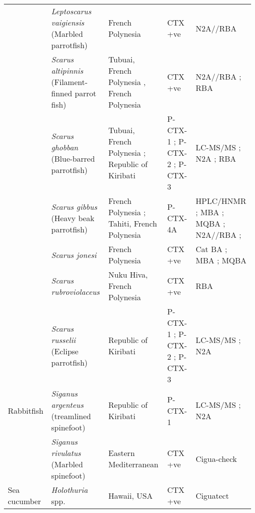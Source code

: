 \documentclass[12pt]{article}
\begin{document}
\begin{longtable}[l]{ | p{2cm} | p{3cm} | p{4.5cm} | p{2cm} | p{3cm} | }
	& \emph{Leptoscarus vaigiensis} (Marbled parrotfish) & French Polynesia \cite{chinain2014mail} & CTX +ve \cite{chinain2014mail} & N2A//RBA \cite{chinain2014mail} \\
	& \emph{Scarus altipinnis} (Filament-finned parrot fish) & Tubuai, French Polynesia \cite{darius2007ciguatera}, French Polynesia \cite{chinain2014mail} & CTX +ve \cite{darius2007ciguatera,chinain2014mail} & N2A//RBA \cite{chinain2014mail}; RBA \cite{darius2007ciguatera} \\
	& \emph{Scarus ghobban} (Blue-barred parrotfish) & Tubuai, French Polynesia \cite{darius2007ciguatera}; Republic of Kiribati \cite{mak2013pacific} & P-CTX-1 \cite{mak2013pacific}; P-CTX-2 \cite{mak2013pacific}; P-CTX-3 \cite{mak2013pacific} & LC-MS/MS \cite{mak2013pacific}; N2A \cite{mak2013pacific}; RBA \cite{darius2007ciguatera} \\
	& \emph{Scarus gibbus} (Heavy beak parrotfish) & French Polynesia \cite{bagnis1987use,satake1996isolation,chinain2014mail}; Tahiti, French Polynesia \cite{pompon1983ciguatera} & P-CTX-4A \cite{satake1996isolation} & HPLC/HNMR \cite{satake1996isolation}; MBA \cite{bagnis1987use,satake1996isolation,pompon1983ciguatera}; MQBA \cite{bagnis1987use}; N2A//RBA \cite{chinain2014mail}; \\
	& \emph{Scarus jonesi} & French Polynesia \cite{bagnis1987use} & CTX +ve \cite{bagnis1987use} & Cat BA \cite{bagnis1987use}; MBA \cite{bagnis1987use}; MQBA \cite{bagnis1987use} \\
	& \emph{Scarus rubroviolaceus} & Nuku Hiva, French Polynesia \cite{darius2007ciguatera} & CTX +ve \cite{darius2007ciguatera} & RBA \cite{darius2007ciguatera}\\
	& \emph{Scarus russelii} (Eclipse parrotfish) & Republic of Kiribati \cite{mak2013pacific} & P-CTX-1 \cite{mak2013pacific}; P-CTX-2 \cite{mak2013pacific}; P-CTX-3 \cite{mak2013pacific} & LC-MS/MS \cite{mak2013pacific}; N2A \cite{mak2013pacific} \\
    \hline
	Rabbitfish & \emph{Siganus argenteus} (treamlined spinefoot) & Republic of Kiribati \cite{mak2013pacific} & P-CTX-1 \cite{mak2013pacific} & LC-MS/MS \cite{mak2013pacific}; N2A \cite{mak2013pacific} \\
	 & \emph{Siganus rivulatus} (Marbled spinefoot) & Eastern Mediterranean \cite{bentur2007ciguatoxin} & CTX +ve \cite{bentur2007ciguatoxin} & Cigua-check \textregistered \cite{bentur2007ciguatoxin}\\
	\hline
	Sea cucumber & \emph{Holothuria} spp. & Hawaii, USA \cite{park2000microbial} & CTX +ve \cite{park2000microbial} & Ciguatect \textregistered \cite{park2000microbial} \\

\end{longtable}
\end{document}
